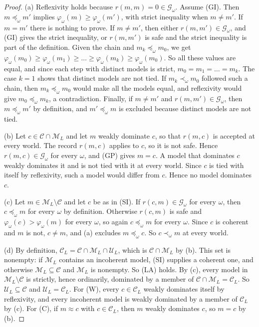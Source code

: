 \documentclass[11pt]{article}
\theoremstyle{definition}
\theoremstyle{remark}
\newcommand{\M}{\mathcal M}
\newcommand{\C}{\mathcal C}
\newcommand{\U}{\mathcal U}
\newcommand{\G}{\mathcal G}
\begin{document}
\begin{proof}
(a) Reflexivity holds because $r(m,m)=0\in\G_\omega$. Assume (GI). Then $m\preceq_\omega m'$ implies $\varphi_\omega(m)\ge\varphi_\omega(m')$, with strict inequality when $m\ne m'$. If $m=m'$ there is nothing to prove. If $m\neq m'$, then either $r(m,m')\in\G_\omega$, and (GI) gives the strict inequality, or $r(m,m')$ is safe and the strict inequality is part of the definition. Given the chain and $m_k\preceq_\omega m_0$, we get $\varphi_\omega(m_0)\ge\varphi_\omega(m_1)\ge\dots\ge\varphi_\omega(m_k)\ge\varphi_\omega(m_0)$. So all these values are equal, and since each step with distinct models is strict, $m_0=m_1=\dots=m_k$. The case $k=1$ shows that distinct models are not tied. If $m_k\prec_\omega m_0$ followed such a chain, then $m_k\preceq_\omega m_0$ would make all the models equal, and reflexivity would give $m_0\preceq_\omega m_k$, a contradiction. Finally, if $m\ne m'$ and $r(m,m')\in\G_\omega$, then $m\preceq_\omega m'$ by definition, and $m'\preceq_\omega m$ is excluded because distinct models are not tied.

(b) Let $c\in\C\cap\M_L$ and let $m$ weakly dominate $c$, so that $r(m,c)$ is accepted at every world. The record $r(m,c)$ applies to $c$, so it is not safe. Hence $r(m,c)\in\G_\omega$ for every $\omega$, and (GP) gives $m=c$. A model that dominates $c$ weakly dominates it and is not tied with it at every world. Since $c$ is tied with itself by reflexivity, such a model would differ from $c$. Hence no model dominates $c$.

(c) Let $m\in\M_L\setminus\C$ and let $c$ be as in (SI). If $r(c,m)\in\G_\omega$ for every $\omega$, then $c\preceq_\omega m$ for every $\omega$ by definition. Otherwise $r(c,m)$ is safe and $\varphi_\omega(c)>\varphi_\omega(m)$ for every $\omega$, so again $c\preceq_\omega m$ for every $\omega$. Since $c$ is coherent and $m$ is not, $c\ne m$, and (a) excludes $m\preceq_\omega c$. So $c\prec_\omega m$ at every world.

(d) By definition, $\C_L=\C\cap\M_L\cap\U_L$, which is $\C\cap\M_L$ by (b). This set is nonempty: if $\M_L$ contains an incoherent model, (SI) supplies a coherent one, and otherwise $\M_L\subseteq\C$ and $\M_L$ is nonempty. So (LA) holds. By (c), every model in $\M_L\setminus\C$ is strictly, hence ordinarily, dominated by a member of $\C\cap\M_L=\C_L$. So $\U_L\subseteq\C$ and $\U_L=\C_L$. For (W), every $c\in\C_L$ weakly dominates itself by reflexivity, and every incoherent model is weakly dominated by a member of $\C_L$ by (c). For (C), if $m\approx c$ with $c\in\C_L$, then $m$ weakly dominates $c$, so $m=c$ by (b).


\end{proof}
\end{document}
